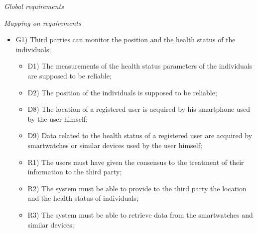 \documentclass{article}
\begin{document}
\begin{legal}
\begin{legal}
\begin{legal}
			
			\item \textit{Global requirements}\\
			\begin{itemize}
			\end{itemize}
			\item \textit{Mapping on requirements}\\
				\begin{itemize}
				\item G1) Third parties can monitor the position and the health status of the individuals;\\
				{\normalfont
					\begin{itemize}
					\item D1) The measurements of the health status parameters of the individuals are supposed to be reliable;\\
	 				\item D2) The position of the individuals is supposed to be reliable;\\
					\item D8) The location of a registered user is acquired by his smartphone used by the user himself;\\
					\item D9) Data related to the health status of a registered user are acquired by smartwatches or similar devices used by the user himself;\\
					\item R1) The users must have given the consensus to the treatment of their information to the third party;\\
					\item R2) The system must be able to provide to the third party the location and the health status of individuals;
					\item R3) The system must be able to retrieve data from the smartwatches and similar devices;\\

\end{itemize}}
\end{itemize}
\end{legal}
\end{legal}
\end{legal}
\end{document}
